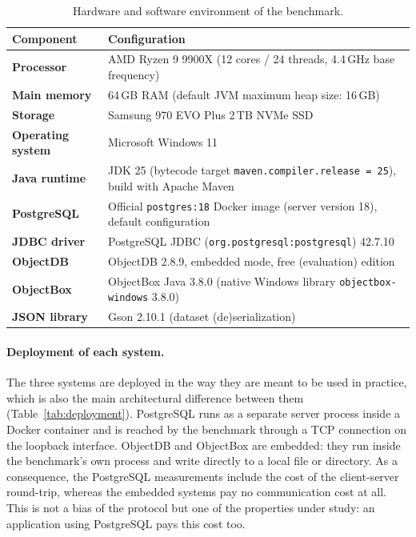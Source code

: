 \documentclass{article}
\begin{document}
\begin{table}[H]
    \centering
    \small
    \begin{tabularx}{\textwidth}{>{\bfseries}p{4.2cm} L}
        \toprule
        \textbf{Component}         & \textbf{Configuration}                                                                                     \\
        \midrule
        Processor                  & AMD Ryzen 9 9900X (12 cores / 24 threads, 4.4\,GHz base frequency) \\
        Main memory                & 64\,GB RAM (default JVM maximum heap size: 16\,GB) \\
        Storage                    & Samsung 970 EVO Plus 2\,TB NVMe SSD \\
        Operating system           & Microsoft Windows 11  \\
        Java runtime               & JDK 25 (bytecode target \texttt{maven.compiler.release = 25}), build with Apache Maven                     \\
        \addlinespace[3pt]
        PostgreSQL                 & Official \texttt{postgres:18} Docker image (server version 18), default configuration \\
        JDBC driver                & PostgreSQL JDBC (\texttt{org.postgresql:postgresql}) 42.7.10                                               \\
        ObjectDB                   & ObjectDB 2.8.9, embedded mode, free (evaluation) edition                                                   \\
        ObjectBox                  & ObjectBox Java 3.8.0 (native Windows library \texttt{objectbox-windows} 3.8.0)                             \\
        JSON library               & Gson 2.10.1 (dataset (de)serialization)                                                                    \\
        \bottomrule
    \end{tabularx}
    \caption{Hardware and software environment of the benchmark.}
    \label{tab:environment}
\end{table}

\paragraph{Deployment of each system.} The three systems are deployed in the way they are meant to be used in practice, which is also the main architectural difference between them (Table~\ref{tab:deployment}). PostgreSQL runs as a separate server process inside a Docker container and is reached by the benchmark through a TCP connection on the loopback interface. ObjectDB and ObjectBox are embedded: they run inside the benchmark's own process and write directly to a local file or directory. As a consequence, the PostgreSQL measurements include the cost of the client-server round-trip, whereas the embedded systems pay no communication cost at all. This is not a bias of the protocol but one of the properties under study: an application using PostgreSQL pays this cost too.
\end{document}
